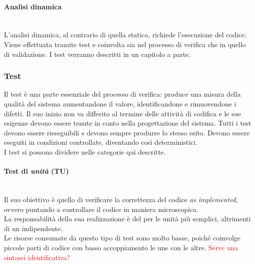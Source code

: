 	\paragraph{Analisi dinamica}
	~\\L'analisi dinamica, al contrario di quella statica, richiede l'esecuzione del codice.
	Viene effettuata tramite test e coinvolta sia nel processo di verifica che in quello di validazione.
	I test verranno descritti in un capitolo a parte.
	\subsubsection{Test}
	Il test è una parte essenziale del processo di verifica: produce una misura della qualità del sistema
	aumentandone il valore, identificandone e rimuovendone i difetti. Il suo inizio non va differito
	al termine delle attività di codifica e le sue esigenze devono essere tenute in conto nella progettazione del sistema. Tutti i test devono essere rieseguibili e devono sempre produrre lo stesso esito. Devono essere eseguiti in condizioni controllate, diventando così deterministici.
	~\\I test si possono dividere nelle categorie qui descritte.
		\paragraph{\textbf{Test di \emph{unità}} \textbf{(TU)}}
		~\\Il suo obiettivo è quello di verificare la correttezza del codice \emph{as implemented}, ovvero
		puntando a controllare il codice in maniera microscopica.
		\\La responsabilità della sua realizzazione è del \progr{} per le unità più semplici, altrimenti
		di un \ver{} indipendente.
		\\Le risorse consumate da questo tipo di test sono molto basse, poiché coinvolge piccole parti di codice con basso accoppiamento le une con le altre. 
		\textcolor{red}{Serve una sintassi identificativa?}
